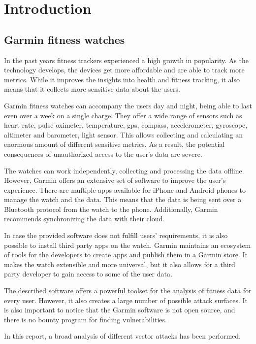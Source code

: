 \section{Introduction}

\subsection{Garmin fitness watches}

In the past years fitness trackers experienced a high growth in popularity.
As the technology develops, the devices get more affordable and are able to track more metrics.
While it improves the insights into health and fitness tracking, it also means that it collects more sensitive data about the users.

Garmin fitness watches can accompany the users day and night, being able to last even over a week on a single charge.
They offer a wide range of sensors such as heart rate, pulse oximeter, temperature, gps, compass, accelerometer, gyroscope, altimeter and barometer, light sensor.
This allows collecting and calculating an enormous amount of different sensitive metrics.
As a result, the potential consequences of unauthorized access to the user's data are severe.

The watches can work independently, collecting and processing the data offline.
However, Garmin offers an extensive set of software to improve the user's experience.
There are multiple apps available for iPhone and Android phones to manage the watch and the data.
This means that the data is being sent over a Bluetooth protocol from the watch to the phone.
Additionally, Garmin recommends synchronizing the data with their cloud.

In case the provided software does not fulfill users' requirements, it is also possible to install third party apps on the watch.
Garmin maintains an ecosystem of tools for the developers to create apps and publish them in a Garmin store.
It makes the watch extensible and more universal, but it also allows for a third party developer to gain access to some of the user data.

The described software offers a powerful toolset for the analysis of fitness data for every user.
However, it also creates a large number of possible attack surfaces.
It is also important to notice that the Garmin software is not open source, and there is no bounty program for finding vulnerabilities.

In this report, a broad analysis of different vector attacks has been performed.

